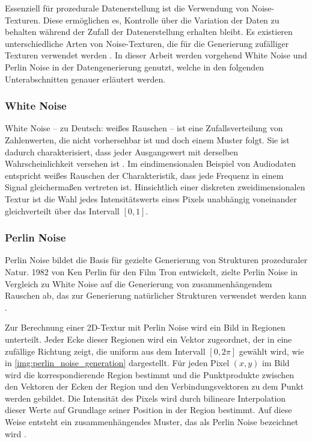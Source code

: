 Essenziell für prozedurale Datenerstellung ist die Verwendung von Noise-Texturen. Diese ermöglichen es, Kontrolle über die Variation der Daten zu behalten während der Zufall der Datenerstellung erhalten bleibt. Es existieren unterschiedliche Arten von Noise-Texturen, die für die Generierung zufälliger Texturen verwendet werden \cite{noise_generation}. In dieser Arbeit werden vorgehend White Noise und Perlin Noise in der Datengenerierung genutzt, welche in den folgenden Unterabschnitten genauer erläutert werden.

\subsubsection{White Noise}

White Noise -- zu Deutsch: weißes Rauschen -- ist eine Zufallsverteilung von Zahlenwerten, die nicht vorhersehbar ist und doch einem Muster folgt. Sie ist dadurch charakterisiert, dass jeder Ausgangswert mit derselben Wahrscheinlichkeit versehen ist \cite{white_noise}. Im eindimensionalen Beispiel von Audiodaten entspricht weißes Rauschen der Charakteristik, dass jede Frequenz in einem Signal gleichermaßen vertreten ist. Hinsichtlich einer diskreten zweidimensionalen Textur ist die Wahl jedes Intensitätswerts eines Pixels unabhängig voneinander gleichverteilt über das Intervall $[0, 1]$.

\subsubsection{Perlin Noise}

Perlin Noise bildet die Basis für gezielte Generierung von Strukturen prozeduraler Natur. 1982 von Ken Perlin für den Film Tron entwickelt, zielte Perlin Noise in Vergleich zu White Noise auf die Generierung von zusammenhängendem Rauschen ab, das zur Generierung natürlicher Strukturen verwendet werden kann \cite{perlin_noise_original,perlin_noise_extension}.

Zur Berechnung einer 2D-Textur mit Perlin Noise wird ein Bild in Regionen unterteilt. Jeder Ecke dieser Regionen wird ein Vektor zugeordnet, der in eine zufällige Richtung zeigt, die uniform aus dem Intervall $[0, 2\pi]$ gewählt wird, wie in \autoref{img:perlin_noise_generation} dargestellt. Für jeden Pixel $(x, y)$ im Bild wird die korrespondierende Region bestimmt und die Punktprodukte zwischen den Vektoren der Ecken der Region und den Verbindungsvektoren zu dem Punkt werden gebildet. Die Intensität des Pixels wird durch bilineare Interpolation dieser Werte auf Grundlage seiner Position in der Region bestimmt. Auf diese Weise entsteht ein zusammenhängendes Muster, das als Perlin Noise bezeichnet wird \cite{perlin_noise_original}.

